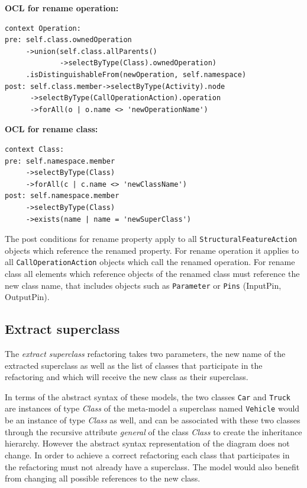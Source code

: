 \documentclass{llncs}
\begin{document}
\textbf{OCL for rename operation:}
\begin{lstlisting}
context Operation:
pre: self.class.ownedOperation
     ->union(self.class.allParents()
             ->selectByType(Class).ownedOperation)
     .isDistinguishableFrom(newOperation, self.namespace)
post: self.class.member->selectByType(Activity).node
      ->selectByType(CallOperationAction).operation
      ->forAll(o | o.name <> 'newOperationName')
\end{lstlisting}
\textbf{OCL for rename class:}
\begin{lstlisting}
context Class:
pre: self.namespace.member
     ->selectByType(Class)
     ->forAll(c | c.name <> 'newClassName')
post: self.namespace.member
     ->selectByType(Class)
     ->exists(name | name = 'newSuperClass')
\end{lstlisting}

The post conditions for rename property apply to all \lstinline|StructuralFeatureAction| objects
which reference the renamed property. For rename operation it applies to all \lstinline|CallOperationAction| objects which
call the renamed operation. For rename class all elements which reference objects of the renamed class must reference
the new class name, that includes objects such as \lstinline|Parameter| or \lstinline|Pins| (InputPin, OutputPin).

\subsection{Extract superclass}
\label{sec:extract}
The \textit{extract superclass} refactoring takes two parameters, the new name of the extracted superclass as well as
the list of classes that participate in the refactoring and which will receive the new class as their superclass.

In terms of the abstract syntax of these models, the two classes \lstinline|Car| and \lstinline|Truck| are instances of 
type \textit{Class} of the meta-model a superclass named \lstinline|Vehicle| would be an instance of type \textit{Class} as well, 
and can be associated with these two classes through the recursive attribute \textit{general} of the class \textit{Class} 
to create the inheritance hierarchy. However the abstract syntax representation of the diagram does not change. In order to 
achieve a correct refactoring each class that participates in the refactoring must not already have a superclass. The 
model would also benefit from changing all possible references to the new class.
\end{document}

